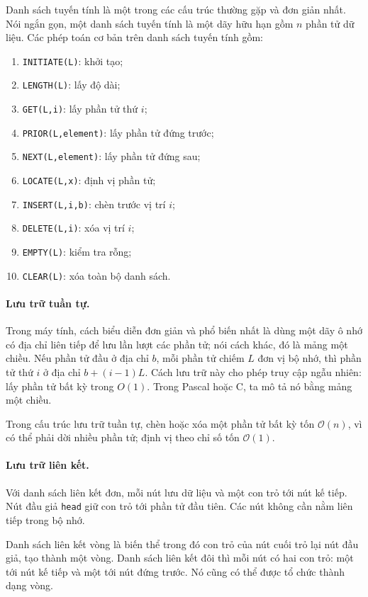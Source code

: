 \documentclass[11pt]{article}
\newcommand{\Oh}{\mathcal{O}}
\begin{document}
Danh sách tuyến tính là một trong các cấu trúc thường gặp và đơn giản nhất.
Nói ngắn gọn, một danh sách tuyến tính là một dãy hữu hạn gồm \(n\) phần tử dữ
liệu. Các phép toán cơ bản trên danh sách tuyến tính gồm:
\begin{enumerate}
  \item \texttt{INITIATE(L)}: khởi tạo;
  \item \texttt{LENGTH(L)}: lấy độ dài;
  \item \texttt{GET(L,i)}: lấy phần tử thứ \(i\);
  \item \texttt{PRIOR(L,element)}: lấy phần tử đứng trước;
  \item \texttt{NEXT(L,element)}: lấy phần tử đứng sau;
  \item \texttt{LOCATE(L,x)}: định vị phần tử;
  \item \texttt{INSERT(L,i,b)}: chèn trước vị trí \(i\);
  \item \texttt{DELETE(L,i)}: xóa vị trí \(i\);
  \item \texttt{EMPTY(L)}: kiểm tra rỗng;
  \item \texttt{CLEAR(L)}: xóa toàn bộ danh sách.
\end{enumerate}

\paragraph{Lưu trữ tuần tự.}
Trong máy tính, cách biểu diễn đơn giản và phổ biến nhất là dùng một dãy ô nhớ
có địa chỉ liên tiếp để lưu lần lượt các phần tử; nói cách khác, đó là mảng
một chiều. Nếu phần tử đầu ở địa chỉ \(b\), mỗi phần tử chiếm \(L\) đơn vị bộ
nhớ, thì phần tử thứ \(i\) ở địa chỉ \(b+(i-1)L\). Cách lưu trữ này cho phép
truy cập ngẫu nhiên: lấy phần tử bất kỳ trong \(O(1)\). Trong Pascal hoặc C,
ta mô tả nó bằng mảng một chiều.

Trong cấu trúc lưu trữ tuần tự, chèn hoặc xóa một phần tử bất kỳ tốn
\(\Oh(n)\), vì có thể phải dời nhiều phần tử; định vị theo chỉ số tốn
\(\Oh(1)\).

\paragraph{Lưu trữ liên kết.}
Với danh sách liên kết đơn, mỗi nút lưu dữ liệu và một con trỏ tới nút kế
tiếp. Nút đầu giả \texttt{head} giữ con trỏ tới phần tử đầu tiên. Các nút
không cần nằm liên tiếp trong bộ nhớ.

Danh sách liên kết vòng là biến thể trong đó con trỏ của nút cuối trỏ lại nút
đầu giả, tạo thành một vòng. Danh sách liên kết đôi thì mỗi nút có hai con
trỏ: một tới nút kế tiếp và một tới nút đứng trước. Nó cũng có thể được tổ
chức thành dạng vòng.
\end{document}

